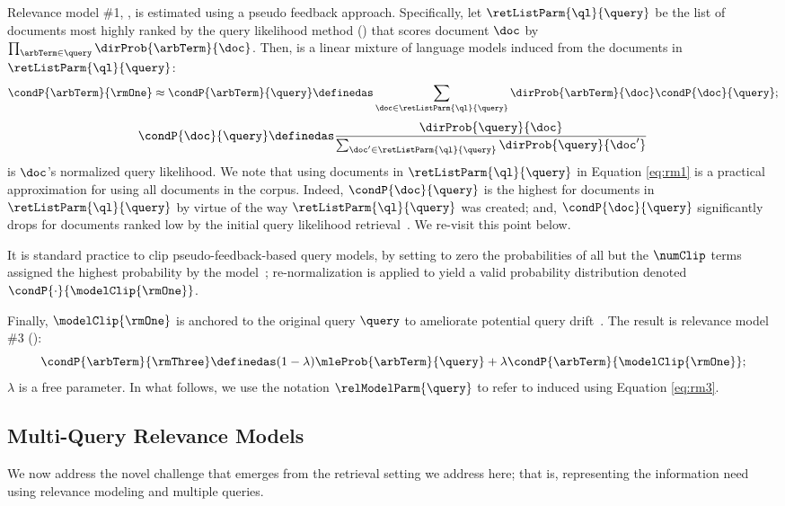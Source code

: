 Relevance model \#1, {\rmOne}, is estimated using a pseudo feedback
approach.
Specifically, let $\retListParm{\ql}{\query}$ be the list of
documents most highly ranked by the query likelihood method (\ql)
\cite{Song+Croft:99a} that scores document $\doc$ by $\prod_{\arbTerm
\in \query}
\dirProb{\arbTerm}{\doc}$.
Then, \rmOne is a linear mixture of language models induced from the documents in $\retListParm{\ql}{\query}$:
\begin{equation}
\label{eq:rm1}
\condP{\arbTerm}{\rmOne} \approx \condP{\arbTerm}{\query} \definedas \sum_{\doc\in \retListParm{\ql}{\query}} \dirProb{\arbTerm}{\doc}\condP{\doc}{\query};
\end{equation} 
\begin{equation}
\label{eq:normQL}
\condP{\doc}{\query}\definedas\frac{\dirProb{\query}{\doc}}{\sum_{\doc' \in \retListParm{\ql}{\query}}\dirProb{\query}{\doc'}}
\end{equation}
is $\doc$'s normalized query likelihood.
We note that using documents in $\retListParm{\ql}{\query}$ in
Equation \ref{eq:rm1} is a practical approximation for using all
documents in the corpus.
Indeed, $\condP{\doc}{\query}$ is the highest for documents in
$\retListParm{\ql}{\query}$ by virtue of the way
$\retListParm{\ql}{\query}$ was created; and, $\condP{\doc}{\query}$
significantly drops for documents ranked low by the initial query
likelihood retrieval~{\cite{Lavrenko+Croft:03a}}.
We re-visit this point below.

It is standard practice to clip pseudo-feedback-based query 
models, by setting to zero the
probabilities of all but the $\numClip$ terms assigned the highest
probability by the
model~\cite{Zhai+Lafferty:01a,Abdul-Jaleel+al:04a}; re-normalization
is applied to yield a valid probability distribution denoted
$\condP{\cdot}{\modelClip{\rmOne}}$.

Finally, $\modelClip{\rmOne}$ is anchored to the original query
$\query$ to ameliorate potential query
drift~\cite{Abdul-Jaleel+al:04a}.
The result is relevance model \#3 (\rmThree):
\begin{equation}
\label{eq:rm3}
\condP{\arbTerm}{\rmThree} \definedas (1-\lambda) \mleProb{\arbTerm}{\query} + \lambda \condP{\arbTerm}{\modelClip{\rmOne}};
\end{equation} 
$\lambda$ is a free parameter.
In what follows, we use the notation $\relModelParm{\query}$ to refer
to {\rmThree} induced using Equation \ref{eq:rm3}.


\subsection{Multi-Query Relevance Models}
\label{sec:multQueries}
We now address the novel challenge that emerges from the retrieval
setting we address here; that is, representing the information need
using relevance modeling and multiple queries.

